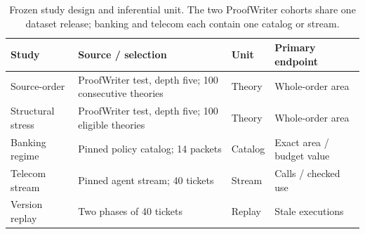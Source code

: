 \begin{table}[H]
\caption{Frozen study design and inferential unit. The two ProofWriter cohorts share one dataset release; banking and telecom each contain one catalog or stream.\label{tab:design}}
\centering\small\renewcommand{\arraystretch}{1.08}
\begin{tabular}{>{\raggedright\arraybackslash}p{2.5cm}>{\raggedright\arraybackslash}p{5cm}>{\raggedright\arraybackslash}p{1.5cm}>{\raggedright\arraybackslash}p{3.0cm}}
\toprule
Study & Source / selection & Unit & Primary endpoint \\
\midrule
Source-order & ProofWriter test, depth five; 100 consecutive theories & Theory & Whole-order area \\
Structural stress & ProofWriter test, depth five; 100 eligible theories & Theory & Whole-order area \\
Banking regime & Pinned policy catalog; 14 packets & Catalog & Exact area / budget value \\
Telecom stream & Pinned agent stream; 40 tickets & Stream & Calls / checked use \\
Version replay & Two phases of 40 tickets & Replay & Stale executions \\
\bottomrule
\end{tabular}
\end{table}
